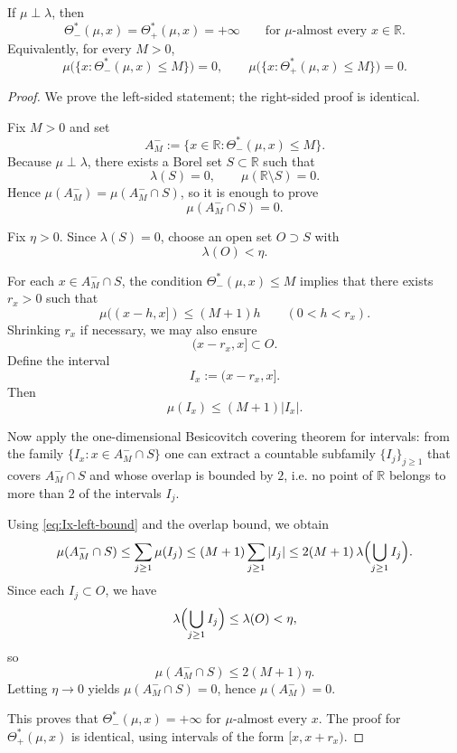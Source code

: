 \begin{lemma}\label{lem:onesided-density}
If $\mu\perp\lambda$, then
\[
\Theta_-^*(\mu,x)=\Theta_+^*(\mu,x)=+\infty
\qquad\text{for }\mu\text{-almost every }x\in\mathbb R.
\]
Equivalently, for every $M>0$,
\[
\mu\bigl(\{x:\Theta_-^*(\mu,x)\le M\}\bigr)=0,
\qquad
\mu\bigl(\{x:\Theta_+^*(\mu,x)\le M\}\bigr)=0.
\]
\end{lemma}

\begin{proof}
We prove the left-sided statement; the right-sided proof is identical.

Fix $M>0$ and set
\[
A_M^-:=\{x\in\mathbb R:\Theta_-^*(\mu,x)\le M\}.
\]
Because $\mu\perp\lambda$, there exists a Borel set $S\subset\mathbb R$ such that
\[
\lambda(S)=0,
\qquad
\mu(\mathbb R\setminus S)=0.
\]
Hence $\mu(A_M^-)=\mu(A_M^-\cap S)$, so it is enough to prove
\[
\mu(A_M^-\cap S)=0.
\]

Fix $\eta>0$. Since $\lambda(S)=0$, choose an open set $O\supset S$ with
\[
\lambda(O)<\eta.
\]

For each $x\in A_M^-\cap S$, the condition $\Theta_-^*(\mu,x)\le M$ implies that there exists $r_x>0$ such that
\[
\mu((x-h,x])\le (M+1)h
\qquad(0<h<r_x).
\]
Shrinking $r_x$ if necessary, we may also ensure
\[
(x-r_x,x]\subset O.
\]
Define the interval
\[
I_x:=(x-r_x,x].
\]
Then
\begin{equation}\label{eq:Ix-left-bound}
\mu(I_x)\le (M+1)|I_x|.
\end{equation}

Now apply the one-dimensional Besicovitch covering theorem for intervals: from the family $\{I_x:x\in A_M^-\cap S\}$ one can extract a countable subfamily $\{I_j\}_{j\ge1}$ that covers $A_M^-\cap S$ and whose overlap is bounded by $2$, i.e.
no point of $\mathbb R$ belongs to more than $2$ of the intervals $I_j$.

Using \eqref{eq:Ix-left-bound} and the overlap bound, we obtain
\[
\mu(A_M^-\cap S)
\le \sum_{j\ge1}\mu(I_j)
\le (M+1)\sum_{j\ge1}|I_j|
\le 2(M+1)\,\lambda\Bigl(\bigcup_{j\ge1}I_j\Bigr).
\]
Since each $I_j\subset O$, we have
\[
\lambda\Bigl(\bigcup_{j\ge1}I_j\Bigr)\le \lambda(O)<\eta,
\]
so
\[
\mu(A_M^-\cap S)\le 2(M+1)\eta.
\]
Letting $\eta\to0$ yields $\mu(A_M^-\cap S)=0$, hence $\mu(A_M^-)=0$.

This proves that $\Theta_-^*(\mu,x)=+\infty$ for $\mu$-almost every $x$.
The proof for $\Theta_+^*(\mu,x)$ is identical, using intervals of the form $[x,x+r_x)$.
\end{proof}

